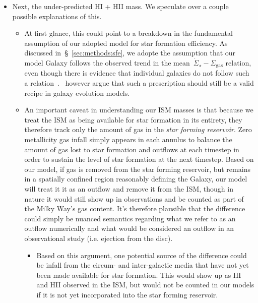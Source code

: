 \documentclass[fleqn, usenatbib]{mnras}
\begin{document}
\begin{appendices}
\begin{itemize}
	\item Next, the under-predicted HI + HII mass. We speculate over a couple 
	possible explanations of this. 
	\begin{itemize} 
		\item At first glance, this could point to a breakdown in the 
		fundamental assumption of our adopted model for star formation 
		efficiency. As discussed in~\S~\ref{sec:methods:sfe}, we adopte the 
		assumption that our model Galaxy follows the observed trend in the 
		mean~$\dot{\Sigma}_\star-\Sigma_\text{gas}$ relation, even though 
		there is evidence that individual galaxies do not follow such a 
		relation~\citep{Ellison2020b}.~\citet{Kennicutt2020} however argue 
		that such a prescription should still be a valid recipe in galaxy 
		evolution models. 

		\item An important caveat in understanding our ISM masses is that 
		because we treat the ISM as being available for star formation in its 
		entirety, they therefore track only the amount of gas in the 
		\textit{star forming reservoir}. Zero metallicity gas infall simply 
		appears in each annulus to balance the amount of gas lost to star 
		formation and outflows at each timestep in order to sustain the 
		level of star formation at the next timestep. Based on our model, if 
		gas is removed from the star forming reservoir, but remains in a 
		spatially confined region reasonably defining the Galaxy, our model 
		will treat it it as an outflow and remove it from the ISM, though in 
		nature it would still show up in observations and be counted as part 
		of the Milky Way's gas content. {\color{red} It's therefore plausible 
		that the difference could simply be nuanced semantics regarding what 
		we refer to as an outflow numerically and what would be considered an 
		outflow in an observational study (i.e. ejection from the disc).} 
		\begin{itemize} 
			\item Based on this argument, one potential source of the 
			difference could be infall from the circum- and inter-galactic 
			media that have not yet been made available for star formation. 
			This would show up as HI and HII observed in the ISM, but would 
			not be counted in our models if it is not yet incorporated into 
			the star forming reservoir. 


\end{itemize}
\end{itemize}
\end{itemize}
\end{appendices}
\end{document}
